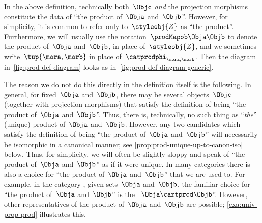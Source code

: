 \begin{remark}
    \label{prod unique up to iso}
    In the above definition, technically both~$\Objc$ \emph{and} the projection morphisms constitute the data of ``the product of~$\Obja$ and~$\Objb$''.
    However, for simplicity, it is common to refer only to~$\styleobj{Z}$ as ``the product''.
    Furthermore, we will usually use the notation~$\prodMapob\Obja\Objb$ to denote the product of~$\Obja$ and~$\Objb$, in place of~$\styleobj{Z}$, and we sometimes write~$\tup{\mora,\morb}$ in place of~$\catprodphi_{\mora, \morb}$.
    Then the diagram in~\cref{fig:prod-def-diagram} looks as in~\cref{fig:prod-def-diagram-generic}.

    The reason we do not do this directly in the definition itself is the following.
    In general, for fixed~$\Obja$ and~$\Objb$, there may be several objects~$\Objc$ (together with projection morphisms) that satisfy the definition of being ``the product of~$\Obja$ and~$\Objb$''.
    Thus, there is, technically, no such thing as ``\emph{the}'' (unique) product of~$\Obja$ and~$\Objb$.
    However, any two candidates which satisfy the definition of being ``the product of~$\Obja$ and~$\Objb$'' will necessarily be isomorphic in a canonical manner; see \cref{prop:prod-unique-up-to-canon-iso} below.
    Thus, for simplicity, we will often be slightly sloppy and speak of ``the product of~$\Obja$ and~$\Objb$'' as if it were unique.
    In many categories there is also a choice for ``the product of~$\Obja$ and~$\Objb$'' that we are used to.
    For example, in the category \Set, given sets~$\Obja$ and~$\Objb$, the familiar choice for ``the product of~$\Obja$ and~$\Objb$'' is the ~$\Obja \cartprod \Objb$''.
    However, other representatives of the product of~$\Obja$ and~$\Objb$ are possible; \cref{exa:univ-prop-prod} illustrates this.
\end{remark}


